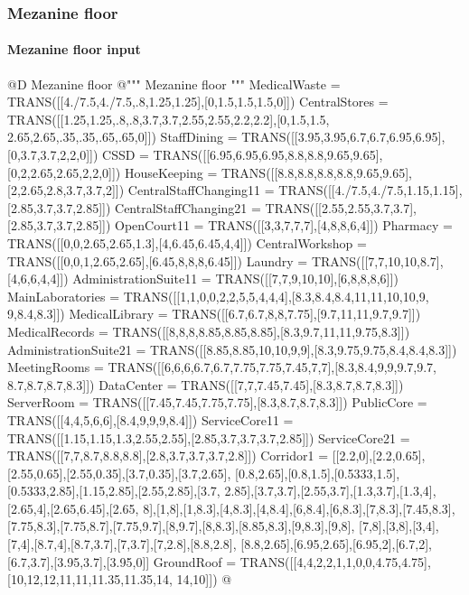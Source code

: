\documentclass[11pt,oneside]{article}    %
\begin{document}
\subsubsection{Mezanine floor}
\paragraph{Mezanine floor input}

@D Mezanine floor
@{""" Mezanine floor """
MedicalWaste = TRANS([[4./7.5,4./7.5,.8,1.25,1.25],[0,1.5,1.5,1.5,0]])
CentralStores = TRANS([[1.25,1.25,.8,.8,3.7,3.7,2.55,2.55,2.2,2.2],[0,1.5,1.5,
    2.65,2.65,.35,.35,.65,.65,0]])
StaffDining = TRANS([[3.95,3.95,6.7,6.7,6.95,6.95],[0,3.7,3.7,2,2,0]])
CSSD = TRANS([[6.95,6.95,6.95,8.8,8.8,9.65,9.65],[0,2,2.65,2.65,2,2,0]])
HouseKeeping = TRANS([[8.8,8.8,8.8,8.8,9.65,9.65],[2,2.65,2.8,3.7,3.7,2]])
CentralStaffChanging11 = TRANS([[4./7.5,4./7.5,1.15,1.15],[2.85,3.7,3.7,2.85]])
CentralStaffChanging21 = TRANS([[2.55,2.55,3.7,3.7],[2.85,3.7,3.7,2.85]])
OpenCourt11 = TRANS([[3,3,7,7,7],[4,8,8,6,4]])
Pharmacy = TRANS([[0,0,2.65,2.65,1.3],[4,6.45,6.45,4,4]])
CentralWorkshop = TRANS([[0,0,1,2.65,2.65],[6.45,8,8,8,6.45]])
Laundry = TRANS([[7,7,10,10,8.7],[4,6,6,4,4]])
AdministrationSuite11 = TRANS([[7,7,9,10,10],[6,8,8,8,6]])
MainLaboratories = TRANS([[1,1,0,0,2,2,5,5,4,4,4],[8.3,8.4,8.4,11,11,10,10,9,
    9,8.4,8.3]])
MedicalLibrary = TRANS([[6.7,6.7,8,8,7.75],[9.7,11,11,9.7,9.7]])
MedicalRecords = TRANS([[8,8,8,8.85,8.85,8.85],[8.3,9.7,11,11,9.75,8.3]])
AdministrationSuite21 = TRANS([[8.85,8.85,10,10,9,9],[8.3,9.75,9.75,8.4,8.4,8.3]])
MeetingRooms = TRANS([[6,6,6,6.7,6.7,7.75,7.75,7.45,7,7],[8.3,8.4,9,9,9.7,9.7,
    8.7,8.7,8.7,8.3]])
DataCenter = TRANS([[7,7,7.45,7.45],[8.3,8.7,8.7,8.3]])
ServerRoom = TRANS([[7.45,7.45,7.75,7.75],[8.3,8.7,8.7,8.3]])
PublicCore = TRANS([[4,4,5,6,6],[8.4,9,9,9,8.4]])
ServiceCore11 = TRANS([[1.15,1.15,1.3,2.55,2.55],[2.85,3.7,3.7,3.7,2.85]])
ServiceCore21 = TRANS([[7,7,8.7,8.8,8.8],[2.8,3.7,3.7,3.7,2.8]])
Corridor1 = [[2.2,0],[2.2,0.65],[2.55,0.65],[2.55,0.35],[3.7,0.35],[3.7,2.65],
    [0.8,2.65],[0.8,1.5],[0.5333,1.5],[0.5333,2.85],[1.15,2.85],[2.55,2.85],[3.7,
    2.85],[3.7,3.7],[2.55,3.7],[1.3,3.7],[1.3,4],[2.65,4],[2.65,6.45],[2.65,
    8],[1,8],[1,8.3],[4,8.3],[4,8.4],[6,8.4],[6,8.3],[7,8.3],[7.45,8.3],
    [7.75,8.3],[7.75,8.7],[7.75,9.7],[8,9.7],[8,8.3],[8.85,8.3],[9,8.3],[9,8],
    [7,8],[3,8],[3,4],[7,4],[8.7,4],[8.7,3.7],[7,3.7],[7,2.8],[8.8,2.8],
    [8.8,2.65],[6.95,2.65],[6.95,2],[6.7,2],[6.7,3.7],[3.95,3.7],[3.95,0]]
GroundRoof = TRANS([[4,4,2,2,1,1,0,0,4.75,4.75],[10,12,12,11,11,11.35,11.35,14,
    14,10]])
@}
\end{document}
